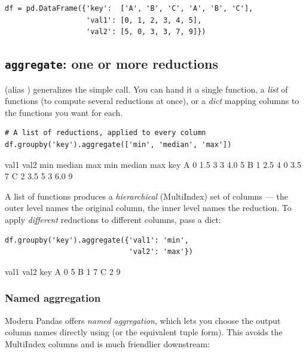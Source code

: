 \documentclass[11pt]{article}
\begin{document}
\begin{lstlisting}
df = pd.DataFrame({'key':  ['A', 'B', 'C', 'A', 'B', 'C'],
                   'val1': [0, 1, 2, 3, 4, 5],
                   'val2': [5, 0, 3, 3, 7, 9]})
\end{lstlisting}

\subsection{\texttt{aggregate}: one or more reductions}

 (alias ) generalizes the simple  call. You can hand it a single function, a \emph{list} of functions (to compute several reductions at once), or a \emph{dict} mapping columns to the functions you want for each.

\begin{lstlisting}
# A list of reductions, applied to every column
df.groupby('key').aggregate(['min', 'median', 'max'])
\end{lstlisting}

\begin{outblock}
    val1            val2
     min median max  min median max
key
A      0    1.5   3    3    4.0   5
B      1    2.5   4    0    3.5   7
C      2    3.5   5    3    6.0   9
\end{outblock}

A list of functions produces a \emph{hierarchical} (MultiIndex) set of columns --- the outer level names the original column, the inner level names the reduction. To apply \emph{different} reductions to different columns, pass a dict:

\begin{lstlisting}
df.groupby('key').aggregate({'val1': 'min',
                             'val2': 'max'})
\end{lstlisting}

\begin{outblock}
     val1  val2
key
A       0     5
B       1     7
C       2     9
\end{outblock}

\subsubsection{Named aggregation}

Modern Pandas offers \emph{named aggregation}, which lets you choose the output column names directly using  (or the equivalent tuple form). This avoids the MultiIndex columns and is much friendlier downstream:
\end{document}
